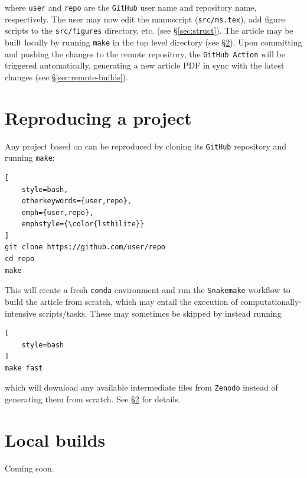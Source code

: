 \documentclass[twocolumn]{aastex631}
\begin{document}
\noindent where {\color{lsthilite}\texttt{user}} and {\color{lsthilite}\texttt{repo}} are the \texttt{GitHub} user name and repository name, respectively.
The user may now edit the manuscript (\texttt{src/ms.tex}), add figure scripts to the \texttt{src/figures} directory, etc. (see \S\ref{sec:struct}).
The article may be built locally by running \texttt{make} in the top level directory (see \S\ref{sec:local-builds}).
Upon committing and pushing the changes to the remote repository, the \texttt{GitHub Action} will be triggered automatically, generating a new article PDF in sync with the latest changes (see \S\ref{sec:remote-builds}).

\section{Reproducing a project}
\label{sec:reproduce}
%
Any project based on \showyourwork can be reproduced by cloning its \texttt{GitHub} repository and running \texttt{make}:\\

\noindent\begin{minipage}{\linewidth}
\begin{lstlisting}[
    style=bash,
    otherkeywords={user,repo},
    emph={user,repo},
    emphstyle={\color{lsthilite}}
]
git clone https://github.com/user/repo
cd repo
make
\end{lstlisting}
\end{minipage}

\noindent This will create a fresh \texttt{conda} environment and run the \texttt{Snakemake} workflow to build the article from scratch, which may entail the execution of computationally-intensive scripts/tasks.
These may sometimes be skipped by instead running\\

\noindent\begin{minipage}{\linewidth}
\begin{lstlisting}[
    style=bash
]
make fast
\end{lstlisting}
\end{minipage}

\noindent which will download any available intermediate files from \texttt{Zenodo} instead of generating them from scratch. See \S\ref{sec:local-builds} for details.

\section{Local builds}
\label{sec:local-builds}
%
Coming soon.
\end{document}
